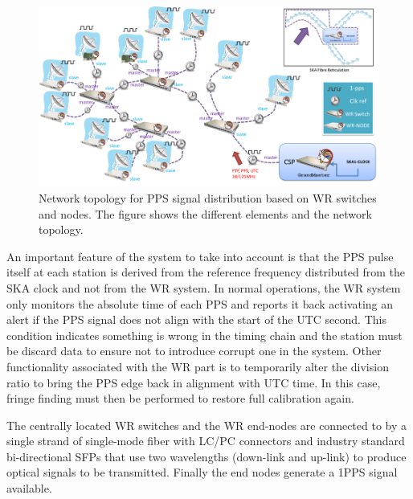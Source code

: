 \begin{figure}[H]
	\centering
	\includegraphics[scale=0.4]{img/ska_pps_network}
	\caption{Network topology for PPS signal distribution based on WR switches and nodes. The figure shows the different elements and the network topology. }
	\label{fig:ska_pps_dist_network}
\end{figure}

 
An important feature of the system to take into account is that the PPS pulse itself at each station is derived from the reference frequency distributed from the SKA clock and not from the WR system. In normal operations, the WR system only monitors the absolute time of each PPS and reports it back activating an alert if the PPS signal does not align with the start of the UTC second. This condition indicates something is wrong in the timing chain and the station must be discard data to ensure not to introduce corrupt one in the system. Other functionality associated with the WR part is to temporarily alter the division ratio to bring the PPS edge back in alignment with UTC time. In this case, fringe finding must then be performed to restore full calibration again.

The centrally located WR switches and the WR end-nodes are connected to by a 
single strand of single-mode fiber with LC/PC connectors and industry standard 
bi-directional SFPs that use two wavelengths (down-link and up-link) to produce 
optical signals to be transmitted. Finally the end nodes generate a 1PPS signal available. 

